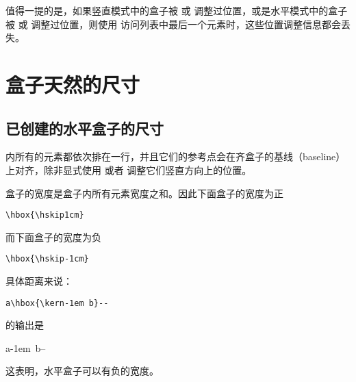 \documentclass{book}
\begin{document}
值得一提的是，如果竖直模式中的盒子被  或  调整过位置，或是水平模式中的盒子被  或  调整过位置，则使用  访问列表中最后一个元素时，这些位置调整信息都会丢失。

\section{盒子天然的尺寸}

\subsection{已创建的水平盒子的尺寸}

 内所有的元素都依次排在一行，并且它们的参考点会在齐盒子的基线（baseline）上对齐，除非显式使用  或者  调整它们竖直方向上的位置。

盒子的宽度是盒子内所有元素宽度之和。因此下面盒子的宽度为正
\begin{verbatim}
\hbox{\hskip1cm}
\end{verbatim}
而下面盒子的宽度为负
\begin{verbatim}
\hbox{\hskip-1cm}
\end{verbatim}
具体距离来说：
\begin{disp}\verb>a\hbox{\kern-1em b}-->\end{disp}
的输出是
\begin{disp}\leavevmode\hphantom{b}a\hbox{\kern-1em b}--\end{disp}
这表明，水平盒子可以有负的宽度。
\end{document}
